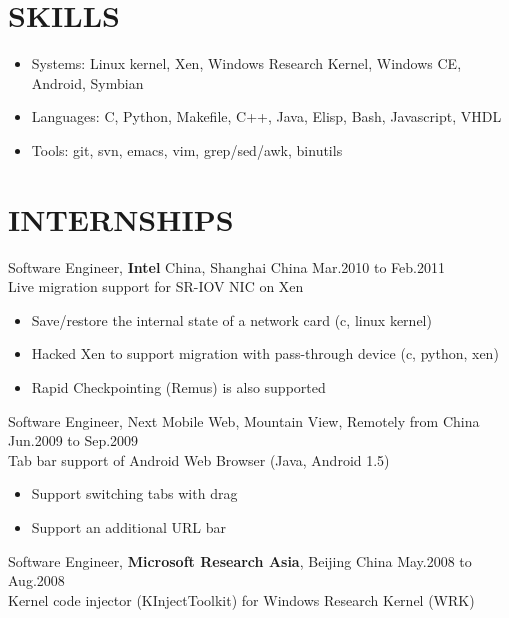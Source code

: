\documentclass[11pt]{res} %
\begin{document}
\begin{resume}

\section{SKILLS}

\begin{itemize} \itemsep -2pt
\item Systems: Linux kernel, Xen, Windows Research Kernel, Windows CE, Android, Symbian
\item Languages: C, Python, Makefile, C++, Java, Elisp, Bash, Javascript, VHDL
\item Tools: git, svn, emacs, vim, grep/sed/awk, binutils
\end{itemize} 

\section{INTERNSHIPS}
Software Engineer, \textbf{Intel} China, Shanghai China \hfill Mar.2010 to Feb.2011 \\
Live migration support for SR-IOV NIC on Xen

\begin{itemize} \itemsep -2pt
\item Save/restore the internal state of a network card (c, linux kernel)
\item Hacked Xen to support migration with pass-through device (c, python, xen)
\item Rapid Checkpointing (Remus) is also supported
\end{itemize} 

Software Engineer, Next Mobile Web, Mountain View, Remotely from China \\
\hspace*{\fill} Jun.2009 to Sep.2009 \\
Tab bar support of Android Web Browser (Java, Android 1.5)

\begin{itemize} \itemsep -2pt
\item Support switching tabs with drag
\item Support an additional URL bar
\end{itemize} 

Software Engineer, \textbf{Microsoft Research Asia}, Beijing China \hfill May.2008 to Aug.2008\\
Kernel code injector (KInjectToolkit) for Windows Research Kernel (WRK)


\end{resume}
\end{document}
